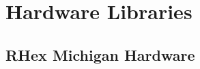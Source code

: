 %
%
% 
% 
% 
% 
% 

%
%

\chapter{Hardware Libraries}
\label{sec:hardware_libraries}

\section{RHex Michigan Hardware}

